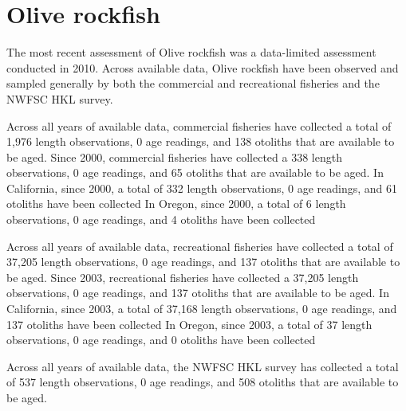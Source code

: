 \documentclass[11pt,
  english,
  letterpaper,
]{article}
\begin{document}

\hypertarget{olive-rockfish}{%
\section{Olive rockfish}\label{olive-rockfish}}

\leavevmode\tagmcend\tagstructend


The most recent assessment of Olive rockfish was a data-limited assessment conducted in 2010. Across available data, Olive rockfish have been observed and sampled generally by both the commercial and recreational fisheries and the NWFSC HKL survey.

\leavevmode\tagmcend\tagstructend\par


Across all years of available data, commercial fisheries have collected a total of 1,976 length observations, 0 age readings, and 138 otoliths that are available to be aged. Since 2000, commercial fisheries have collected a 338 length observations, 0 age readings, and 65 otoliths that are available to be aged. In California, since 2000, a total of 332 length observations, 0 age readings, and 61 otoliths have been collected In Oregon, since 2000, a total of 6 length observations, 0 age readings, and 4 otoliths have been collected

\leavevmode\tagmcend\tagstructend\par


Across all years of available data, recreational fisheries have collected a total of 37,205 length observations, 0 age readings, and 137 otoliths that are available to be aged. Since 2003, recreational fisheries have collected a 37,205 length observations, 0 age readings, and 137 otoliths that are available to be aged. In California, since 2003, a total of 37,168 length observations, 0 age readings, and 137 otoliths have been collected In Oregon, since 2003, a total of 37 length observations, 0 age readings, and 0 otoliths have been collected

\leavevmode\tagmcend\tagstructend\par


Across all years of available data, the NWFSC HKL survey has collected a total of 537 length observations, 0 age readings, and 508 otoliths that are available to be aged.
\end{document}

